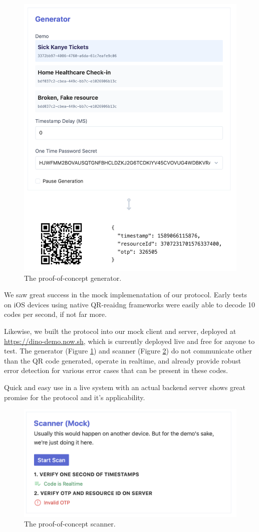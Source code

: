 \documentclass[10pt,twocolumn,letterpaper]{article}
\begin{document}
\begin{figure}[t]
   \begin{center}
      \includegraphics[width=0.8\linewidth]{gen.png}
   \end{center}
      \caption{The proof-of-concept generator.}
   \label{fig:gen}
\end{figure}


We saw great success in the mock implemenatation of our protocol. Early tests on iOS devices using native QR-reaidng frameworks were easily able to decode 10 codes per second, if not far more.

Likewise, we built the protocol into our mock client and server, deployed at \url{https://dino-demo.now.sh}, which is currently deployed live and free for anyone to test. The generator (Figure \ref{fig:gen}) and scanner (Figure \ref{fig:scan}) do not communicate other than the QR code generated, operate in realtime, and already provide robust error detection for various error cases that can be present in these codes.

Quick and easy use in a live system with an actual backend server shows great promise for the protocol and it's applicability.

\begin{figure}[t]
   \begin{center}
      \includegraphics[width=0.8\linewidth]{scan.png}
   \end{center}
      \caption{The proof-of-concept scanner.}
   \label{fig:scan}
\end{figure}
\end{document}
